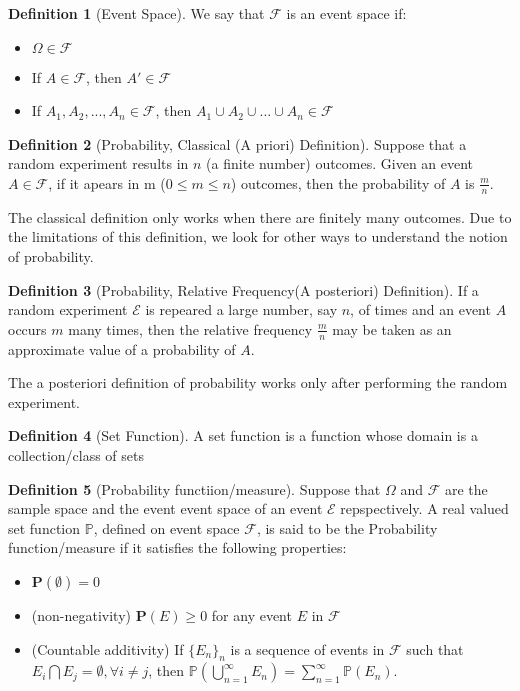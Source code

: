 \documentclass[11pt]{article}
\theoremstyle{definition}
\newtheorem{defn}{Definition}
\begin{document}
\begin{defn} [Event Space]
We say that $\mathcal{F}$ is an event space if:
\begin{itemize}
    \item[1] $\Omega \in \mathcal{F}$
    \item[2] If $A \in \mathcal{F}$, then $A' \in \mathcal{F}$
    \item[3] If $A_1, A_2, ..., A_n \in \mathcal{F}$, then $A_1 \cup A_2 \cup ... \cup A_n \in \mathcal{F}$ 
\end{itemize}
\end{defn}

\begin{defn}
[Probability, Classical (A priori) Definition] Suppose that a random experiment results in $n$ (a finite number) outcomes. Given an event $\mathit{A} \in \mathcal{F}$, if it apears in m ($0 \leq m \leq n$) outcomes, then the probability of $\mathit{A}$ is $\frac{m}{n}$. \
\end{defn}

The classical definition only works when there are finitely many outcomes. Due to the limitations of this definition, we look for other ways to understand the notion of probability.\\

\begin{defn}[Probability, Relative Frequency(A posteriori) Definition]
If a random experiment $\mathcal{E}$ is repeared a large number, say $n$, of times and an event $\mathit{A}$ occurs $m$ many times, then the relative frequency $\frac{m}{n}$ may be taken as an approximate value of a probability of $\mathit{A}$.

The a posteriori definition of probability works only after performing the random experiment.
\end{defn}


\begin{defn}[Set Function]
A set function is a function whose domain is a collection/class of sets
\end{defn}

\begin{defn}[Probability functiion/measure]
Suppose that $\Omega$ and $\mathcal{F}$ are the sample space and the event event space of an event $\mathcal{E}$ repspectively. A real valued set function $\mathbb{P}$, defined on event space $\mathcal{F}$, is said to be the Probability function/measure if it satisfies the following properties:
\begin{itemize}
\item $\mathbf{P}(\emptyset) = 0$
\item (non-negativity) $\mathbf{P}(E) \geq 0$ for any event $E$ in $\mathcal{F}$
\item (Countable additivity) If $\{E_n\}_n$ is a sequence of events in $\mathcal{F}$ such that $E_i \bigcap E_j = \emptyset , \forall i \neq j$, then $\mathbb{P} (\bigcup_{n=1}^{\infty} E_n) = \sum_{n = 1}^{\infty} \mathbb{P}(E_n)$.
\end{itemize}
\end{defn}
\end{document}
